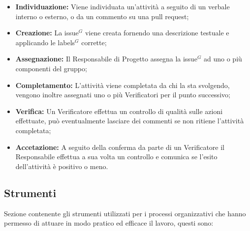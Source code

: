         \begin{itemize}
            \item \textbf{Individuazione:} Viene individuata un'attività a seguito di un verbale interno o esterno, o da un commento su una pull request;
            \item \textbf{Creazione:} La issue$^{G}$ viene creata fornendo una descrizione testuale e applicando le labels$^{G}$ corrette;
            \item \textbf{Assegnazione:} Il Responsabile di Progetto assegna la issue$^{G}$ ad uno o più componenti del gruppo;
            \item \textbf{Completamento:} L'attività viene completata da chi la sta svolgendo, vengono inoltre assegnati uno o più Verificatori per il punto successivo;
            \item \textbf{Verifica:} Un Verificatore effettua un controllo di qualità sulle azioni effettuate, può eventualmente lasciare dei commenti se non ritiene l'attività completata;
            \item \textbf{Accetazione:} A seguito della conferma da parte di un Verificatore il Responsabile effettua a sua volta un controllo e comunica se l'esito dell'attività è positivo o meno.
        \end{itemize}
       
        



        \subsection{Strumenti}

        Sezione contenente gli strumenti utilizzati per i processi organizzativi che hanno permesso di attuare in modo pratico ed efficace il lavoro, questi sono:


